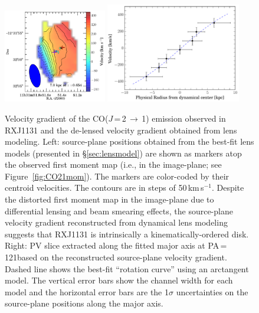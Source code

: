 \documentclass[]{emulateapj}
\newcommand{\rarr}{$\rightarrow$}
\newcommand{\bco}{\mbox{CO($J$\,=\,2\,\rarr\,1)}\xspace}
\newcommand{\kms}{\mbox{km\,s$^{-1}$}\xspace}
\newcommand{\Fig}[1]{Figure~\ref{fig:#1}}
\newcommand{\Sec}[1]{\S\ref{sec:#1}}
\begin{document}
\begin{figure}[!htbp]
\centering
\includegraphics[trim=0 0 30 0, clip, width=0.4\textwidth]{f9a.pdf}
\includegraphics[width=0.525\textwidth]{f9b.pdf}
\caption{Velocity gradient of the \bco emission observed in RXJ1131 and the de-lensed velocity gradient obtained from lens modeling.
Left: source-plane positions obtained from the best-fit lens models (presented in \Sec{lensmodel}) are shown
as markers
atop the observed first moment map (i.e., in the image-plane; see \Fig{CO21mom}).
The markers are color-coded by their centroid velocities.
The contours are in steps of 50\,\kms.
Despite the distorted first moment map in the image-plane due to differential lensing and beam smearing effects, the source-plane velocity gradient reconstructed from dynamical lens modeling suggests that
RXJ1131 is intrinsically a kinematically-ordered disk.
Right: PV slice extracted along the fitted major axis at PA\,=\,121\degr based on
the reconstructed source-plane velocity gradient.
Dashed line shows the best-fit ``rotation curve'' using an arctangent model.
The vertical error bars show the channel width for
each model and the horizontal error bars are the
1$\sigma$ uncertainties on the source-plane positions along the major axis.
\label{fig:PV}}
\end{figure}
\end{document}
